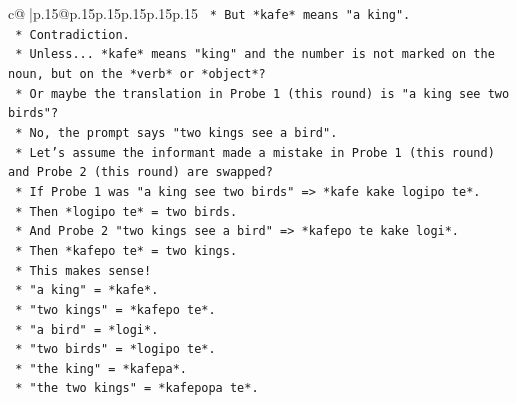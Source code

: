\documentclass{article}
\begin{document}
{\begin{supertabular}{c@{$\;$}|p{.15\linewidth}@{}p{.15\linewidth}p{.15\linewidth}p{.15\linewidth}p{.15\linewidth}p{.15\linewidth}}
{{{\texttt{                                                        *   But *kafe* means "a king".} \\
\texttt{                                                        *   Contradiction.} \\
\texttt{                                                    *   Unless... *kafe* means "king" and the number is not marked on the noun, but on the *verb* or *object*?} \\
\texttt{                                                    *   Or maybe the translation in Probe 1 (this round) is "a king see two birds"?} \\
\texttt{                                                    *   No, the prompt says "two kings see a bird".} \\
\texttt{                                                    *   Let's assume the informant made a mistake in Probe 1 (this round) and Probe 2 (this round) are swapped?} \\
\texttt{                                                    *   If Probe 1 was "a king see two birds" => *kafe kake logipo te*.} \\
\texttt{                                                        *   Then *logipo te* = two birds.} \\
\texttt{                                                        *   And Probe 2 "two kings see a bird" => *kafepo te kake logi*.} \\
\texttt{                                                        *   Then *kafepo te* = two kings.} \\
\texttt{                                                        *   This makes sense!} \\
\texttt{                                                        *   "a king" = *kafe*.} \\
\texttt{                                                        *   "two kings" = *kafepo te*.} \\
\texttt{                                                        *   "a bird" = *logi*.} \\
\texttt{                                                        *   "two birds" = *logipo te*.} \\
\texttt{                                                        *   "the king" = *kafepa*.} \\
\texttt{                                                        *   "the two kings" = *kafepopa te*.} \\
}}}
\end{supertabular}}
\end{document}
